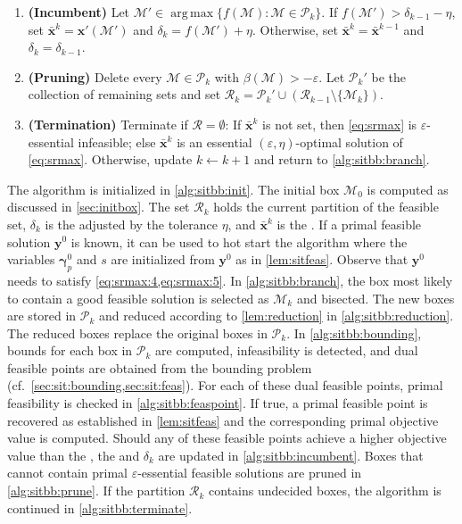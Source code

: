 \documentclass[a4paper,10pt,journal]{IEEEtran}
\DeclareMathOperator*\argmax{arg\,max}
\let\vec\bm
\begin{document}
\begin{algorithm}
\begin{minipage}{\linewidth-1em}
\begin{enumerate}[label=\textbf{Step \arabic*},ref=Step~\arabic*,start=0,leftmargin=*]
%
		\item\label{alg:sitbb:incumbent} {\bfseries (Incumbent)} Let $\mathcal M' \in \argmax\{ f(\mathcal M) : \mathcal M\in\mathscr P_k \}$. If $f(\mathcal M') > \delta_{k-1} - \eta$, set $\bar{\vec x}^k = \vec x'(\mathcal M')$ and $\delta_k = f(\mathcal M') + \eta$. Otherwise, set $\bar{\vec x}^k = \bar{\vec x}^{k-1}$ and $\delta_k = \delta_{k-1}$.
%
		\item\label{alg:sitbb:prune} {\bfseries (Pruning)} Delete every $\mathcal M\in\mathscr P_k$ with $\beta(\mathcal M) > -\varepsilon$. Let $\mathscr P_k'$ be the collection of remaining sets and set $\mathscr R_k = \mathscr P_k'\cup(\mathscr R_{k-1}\setminus\{\mathcal M_k\})$.
%
		\item\label{alg:sitbb:terminate} {\bfseries (Termination)} Terminate if $\mathscr R = \emptyset$: If $\bar{\vec x}^k$ is not set, then \cref{eq:srmax} is $\varepsilon$-essential infeasible; else $\bar{\vec x}^k$ is an essential $(\varepsilon, \eta)$-optimal solution of \cref{eq:srmax}. Otherwise, update $k\gets k+1$ and return to \ref{alg:sitbb:branch}.
	\end{enumerate}
	\end{minipage}
\end{algorithm}

The algorithm is initialized in \ref{alg:sitbb:init}. The initial box $\mathcal M_0$ is computed as discussed in \cref{sec:initbox}. The set $\mathscr R_k$ holds the current partition of the feasible set, $\delta_k$ is the  adjusted by the tolerance $\eta$, and $\bar{\vec x}^k$ is the . If a primal feasible solution $\vec y^0$ is known, it can be used to hot start the algorithm where the variables $\vec\gamma_p^0$ and $s$ are initialized from $\vec y^0$ as in \cref{lem:sitfeas}. Observe that $\vec y^0$ needs to satisfy \cref{eq:srmax:4,eq:srmax:5}. In \ref{alg:sitbb:branch}, the box most likely to contain a good feasible solution is selected as $\mathcal M_k$ and bisected. The new boxes are stored in $\mathscr P_k$ and reduced according to \cref{lem:reduction} in \ref{alg:sitbb:reduction}. The reduced boxes replace the original boxes in $\mathscr P_k$. In \ref{alg:sitbb:bounding}, bounds for each box in $\mathscr P_k$ are computed, infeasibility is detected, and dual feasible points are obtained from the bounding problem (cf.~\cref{sec:sit:bounding,sec:sit:feas}). For each of these dual feasible points, primal feasibility is checked in \ref{alg:sitbb:feaspoint}. If true, a primal feasible point is recovered as established in \cref{lem:sitfeas} and the corresponding primal objective value is computed. Should any of these feasible points achieve a higher objective value than the , the  and $\delta_k$ are updated in \ref{alg:sitbb:incumbent}. Boxes that cannot contain primal $\varepsilon$-essential feasible solutions are pruned in \ref{alg:sitbb:prune}. If the partition $\mathscr R_k$ contains undecided boxes, the algorithm is continued in \ref{alg:sitbb:terminate}.
\end{document}
